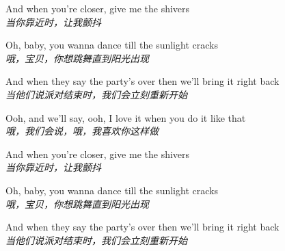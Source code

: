 \begin{spacing}{1.5}
\begin{flushleft}
And when you're closer, give me the shivers\\
\textit{当你靠近时，让我颤抖}\lyricspace

Oh, baby, you wanna dance till the sunlight cracks\\
\textit{哦，宝贝，你想跳舞直到阳光出现}\lyricspace

And when they say the party's over then we'll bring it right back\\
\textit{当他们说派对结束时，我们会立刻重新开始}\lyricspace

Ooh, and we'll say, ooh, I love it when you do it like that\\
\textit{哦，我们会说，哦，我喜欢你这样做}\lyricspace

And when you're closer, give me the shivers\\
\textit{当你靠近时，让我颤抖}\lyricspace

Oh, baby, you wanna dance till the sunlight cracks\\
\textit{哦，宝贝，你想跳舞直到阳光出现}\lyricspace

And when they say the party's over then we'll bring it right back\\
\textit{当他们说派对结束时，我们会立刻重新开始}\lyricspace
\end{flushleft}
\end{spacing}
